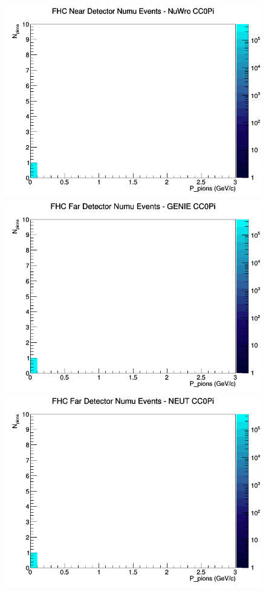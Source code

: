 \documentclass[12pt]{article}
\begin{document}
\begin{figure}[h]
\includegraphics[width=\linewidth]{N_P/nominal/pions/CC0Pi_FHC_ND_numu_N_P_NuWro.png}
\endminipage
\newline
{}
\includegraphics[width=\linewidth]{N_P/nominal/pions/CC0Pi_FHC_FD_numu_N_P_GENIE.png}
\endminipage
{}
\includegraphics[width=\linewidth]{N_P/nominal/pions/CC0Pi_FHC_FD_numu_N_P_NEUT.png}

\end{figure}
\end{document}
